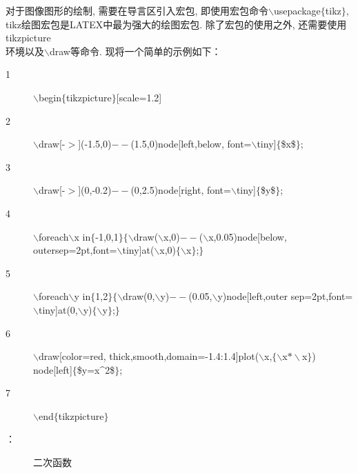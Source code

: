 对于图像图形的绘制, 需要在导言区引入宏包, 即使用宏包命令$\backslash$usepackage$\{$tikz$\}$, tikz绘图宏包是LATEX中最为强大的绘图宏包. 除了宏包的使用之外, 还需要使用tikzpicture\\环境以及$\backslash$draw等命令. 现将一个简单的示例如下：
\begin{description}
    \item[1]$\backslash$begin$\{$tikzpicture$\}$[scale=1.2]
    \item[2]$\backslash$draw[-$>$](-1.5,0)$--$(1.5,0)node[left,below,
        font=$\backslash$tiny]$\{$\$x\$$\}$;
    \item[3] $\backslash$draw[-$>$](0,-0.2)$--$(0,2.5)node[right,
        font=$\backslash$tiny]$\{$\$y\$$\}$;
    \item[4]$\backslash$foreach$\backslash$x in$\{$-1,0,1$\}\{\backslash$draw($\backslash$x,0)$--$($\backslash$x,0.05)node[below,
        outersep=2pt,font=$\backslash$tiny]at($\backslash$x,0)$\{\backslash$x$\}$;$\}$
    \item[5]$\backslash$foreach$\backslash$y in$\{$1,2$\}\{\backslash$draw(0,$\backslash$y)$--$(0.05,$\backslash$y)node[left,outer sep=2pt,font=$\backslash$tiny]at(0,$\backslash$y)$\{\backslash$y$\}$;$\}$
    \item[6]$\backslash$draw[color=red, thick,smooth,domain=-1.4:1.4]plot($\backslash$x,$\{\backslash$x$*\backslash$x$\}$)
        node[left]$\{$\$y=x\^{}2\$$\}$;
    \item[7]$\backslash$end$\{$tikzpicture$\}$
  \end{description}
  ：
  \begin{figure}[H]
  \centering
    \vspace*{-13pt}
  \caption{二次函数}\vspace*{-13pt}
  \end{figure}

